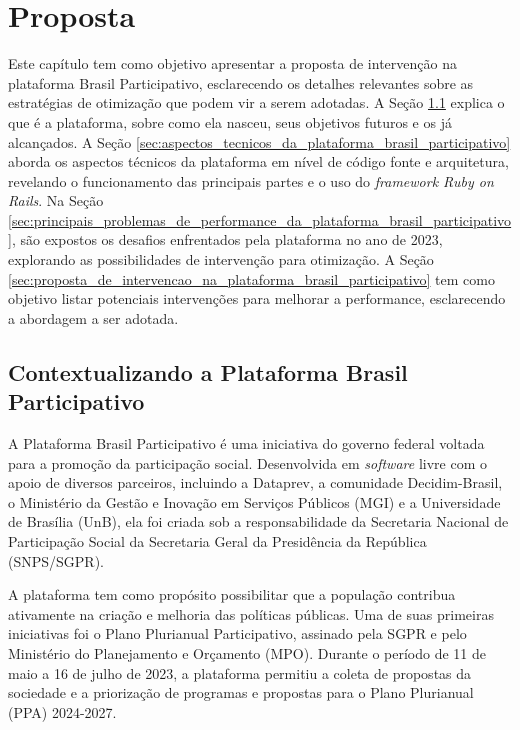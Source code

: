\chapter{Proposta}

Este capítulo tem como objetivo apresentar a proposta de intervenção na plataforma Brasil Participativo, esclarecendo os detalhes relevantes sobre as estratégias de otimização que podem vir a serem adotadas. A Seção \ref{sec:contextualizando_a_plataforma_brasil_participativo} explica o que é a plataforma, sobre como ela nasceu, seus objetivos futuros e os já alcançados. A Seção \ref{sec:aspectos_tecnicos_da_plataforma_brasil_participativo} aborda os aspectos técnicos da plataforma em nível de código fonte e arquitetura, revelando o funcionamento das principais partes e o uso do \textit{framework Ruby on Rails}. Na Seção \ref{sec:principais_problemas_de_performance_da_plataforma_brasil_participativo}, são expostos os desafios enfrentados pela plataforma no ano de 2023, explorando as possibilidades de intervenção para otimização. A Seção \ref{sec:proposta_de_intervencao_na_plataforma_brasil_participativo} tem como objetivo listar potenciais intervenções para melhorar a performance, esclarecendo a abordagem a ser adotada.

\section{Contextualizando a Plataforma Brasil Participativo}
\label{sec:contextualizando_a_plataforma_brasil_participativo}

A Plataforma Brasil Participativo é uma iniciativa do governo federal voltada para a promoção da participação social. Desenvolvida em \textit{software} livre com o apoio de diversos parceiros, incluindo a Dataprev, a comunidade Decidim-Brasil, o Ministério da Gestão e Inovação em Serviços Públicos (MGI) e a Universidade de Brasília (UnB), ela foi criada sob a responsabilidade da Secretaria Nacional de Participação Social da Secretaria Geral da Presidência da República (SNPS/SGPR).

A plataforma tem como propósito possibilitar que a população contribua ativamente na criação e melhoria das políticas públicas. Uma de suas primeiras iniciativas foi o Plano Plurianual Participativo, assinado pela SGPR e pelo Ministério do Planejamento e Orçamento (MPO). Durante o período de 11 de maio a 16 de julho de 2023, a plataforma permitiu a coleta de propostas da sociedade e a priorização de programas e propostas para o Plano Plurianual (PPA) 2024-2027.

